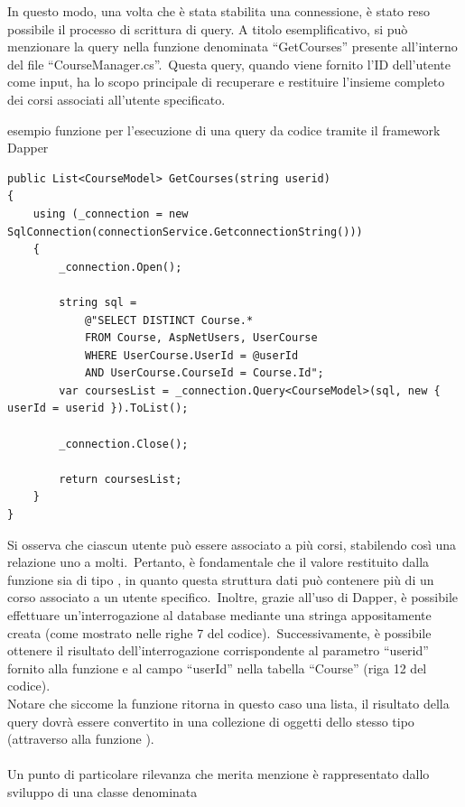 %
In questo modo, una volta che è stata stabilita una connessione, 
è stato reso possibile il processo di scrittura di query. A titolo esemplificativo, si può menzionare 
la query nella funzione denominata ``GetCourses'' presente all'interno del file ``CourseManager.cs''.\ Questa query, 
quando viene fornito l'ID dell'utente come input, ha lo scopo principale di recuperare e restituire 
l'insieme completo dei corsi associati all'utente specificato.
%
\begin{algorithm}[H]
	\caption{esempio funzione per l'esecuzione di una query da codice tramite il framework Dapper}
	\label{lst:genic_mpi}
	\begin{lstlisting}[label=lst:test]
public List<CourseModel> GetCourses(string userid)
{
	using (_connection = new SqlConnection(connectionService.GetconnectionString()))
	{
		_connection.Open();

		string sql = 
			@"SELECT DISTINCT Course.* 
			FROM Course, AspNetUsers, UserCourse 
			WHERE UserCourse.UserId = @userId     
			AND UserCourse.CourseId = Course.Id";
		var coursesList = _connection.Query<CourseModel>(sql, new { userId = userid }).ToList();

		_connection.Close();

		return coursesList;
	}
} 
	\end{lstlisting}
\end{algorithm}
%
Si osserva che ciascun utente può essere associato a più corsi, 
stabilendo così una relazione uno a molti.\ Pertanto, è fondamentale 
che il valore restituito dalla funzione sia di tipo , 
in quanto questa struttura dati può contenere più di un corso associato a 
un utente specifico.\ Inoltre, grazie all'uso di Dapper, è possibile effettuare 
un'interrogazione al database mediante una stringa appositamente creata 
(come mostrato nelle righe 7 del codice).\ Successivamente, è possibile 
ottenere il risultato dell'interrogazione corrispondente al parametro ``userid'' 
fornito alla funzione e al campo ``userId'' nella tabella ``Course'' (riga 12 del codice).
\\
Notare che siccome la funzione ritorna in questo caso una lista, il risultato della query
dovrà essere convertito in una collezione di oggetti dello stesso tipo (attraverso alla funzione ).
%
\\ \\
%
Un punto di particolare rilevanza che merita menzione è rappresentato dallo sviluppo di una classe denominata 
